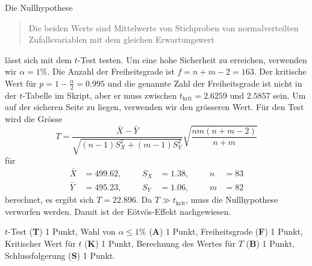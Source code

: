 \begin{loesung}
Die Nullhypothese
\begin{quote}
Die beiden Werte sind Mittelwerte von Stichproben von normalverteilten
Zufallsvariablen mit dem gleichen Erwartungswert
\end{quote}
lässt sich mit dem $t$-Test testen.
Um eine hohe Sicherheit zu erreichen, verwenden wir $\alpha=1\%$.
Die Anzahl der Freiheitsgrade ist $f=n+m-2= 163$.
Der kritische Wert für $p=1-\frac{\alpha}2=0.995$ und die genannte
Zahl der Freiheitsgrade ist nicht in der $t$-Tabelle im Skript,
aber er muss zwischen $t_{\text{krit}}=2.6259$ und $2.5857$ sein.
Um auf der sicheren Seite zu liegen, verwenden wir den grösseren Wert.
Für den Test wird die Grösse
\[
T = \frac{\bar{X}-\bar{Y}}{\sqrt{(n-1)S_X^2 + (m-1)S_Y^2}}
\sqrt{\frac{nm(n+m-2)}{n+m}}
\]
für 
\begin{equation*}
\begin{aligned}
\bar{X}&=499.62,&&& S_X&=1.38,&&&  n&=83\\
\bar{Y}&=495.23,&&& S_Y&=1.06,&&&  m&=82
\end{aligned}
\end{equation*}
berechnet, es ergibt sich $T=22.896$.
Da $T\gg t_{\text{krit}}$, muss die Nullhypothese verworfen werden.
Damit ist der Eötvös-Effekt nachgewiesen.
\end{loesung}

\begin{bewertung}
$t$-Test ({\bf T}) 1 Punkt,
Wahl von $\alpha\le 1\%$ ({\bf A}) 1 Punkt,
Freiheitsgrade ({\bf F}) 1 Punkt,
Kritischer Wert für $t$ ({\bf K}) 1 Punkt,
Berechnung des Wertes für $T$ ({\bf B}) 1 Punkt,
Schlussfolgerung ({\bf S}) 1 Punkt.
\end{bewertung}
